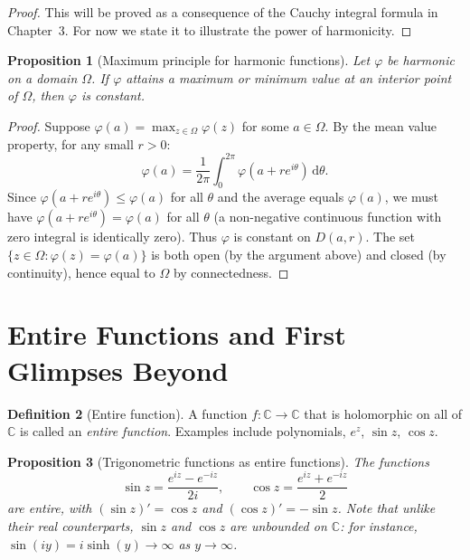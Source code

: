 \documentclass[12pt,a4paper,openany]{book}
\theoremstyle{definition}
\newtheorem{definition}{Definition}[chapter]
\theoremstyle{plain}
\newtheorem{proposition}[definition]{Proposition}
\theoremstyle{remark}
\newcommand{\C}{\mathbb{C}}
\newcommand{\dd}{\mathrm{d}}
\begin{document}
\begin{proof}
This will be proved as a consequence of the Cauchy integral formula in Chapter~3. For now we state it to illustrate the power of harmonicity.
\end{proof}

\begin{proposition}[Maximum principle for harmonic functions]
\label{prop:max-principle-harmonic}
Let $\varphi$ be harmonic on a domain $\Omega$. If $\varphi$ attains a maximum or minimum value at an interior point of $\Omega$, then $\varphi$ is constant.
\end{proposition}

\begin{proof}
Suppose $\varphi(a) = \max_{z\in\Omega}\varphi(z)$ for some $a\in\Omega$. By the mean value property, for any small $r>0$:
\[
  \varphi(a) = \frac{1}{2\pi}\int_0^{2\pi}\varphi(a+re^{i\theta})\,\dd\theta.
\]
Since $\varphi(a+re^{i\theta})\leq\varphi(a)$ for all $\theta$ and the average equals $\varphi(a)$, we must have $\varphi(a+re^{i\theta})=\varphi(a)$ for all $\theta$ (a non-negative continuous function with zero integral is identically zero). Thus $\varphi$ is constant on $D(a,r)$. The set $\{z\in\Omega:\varphi(z)=\varphi(a)\}$ is both open (by the argument above) and closed (by continuity), hence equal to $\Omega$ by connectedness.
\end{proof}

\section{Entire Functions and First Glimpses Beyond}
\label{sec:entire}

\begin{definition}[Entire function]
\label{def:entire}
A function $f:\C\to\C$ that is holomorphic on all of $\C$ is called an \emph{entire function}. Examples include polynomials, $e^z$, $\sin z$, $\cos z$.
\end{definition}

\begin{proposition}[Trigonometric functions as entire functions]
\label{prop:trig-entire}
The functions
\[
  \sin z = \frac{e^{iz}-e^{-iz}}{2i}, \qquad \cos z = \frac{e^{iz}+e^{-iz}}{2}
\]
are entire, with $(\sin z)' = \cos z$ and $(\cos z)' = -\sin z$. Note that unlike their real counterparts, $\sin z$ and $\cos z$ are \emph{unbounded} on $\C$: for instance, $\sin(iy) = i\sinh(y)\to\infty$ as $y\to\infty$.
\end{proposition}
\end{document}
